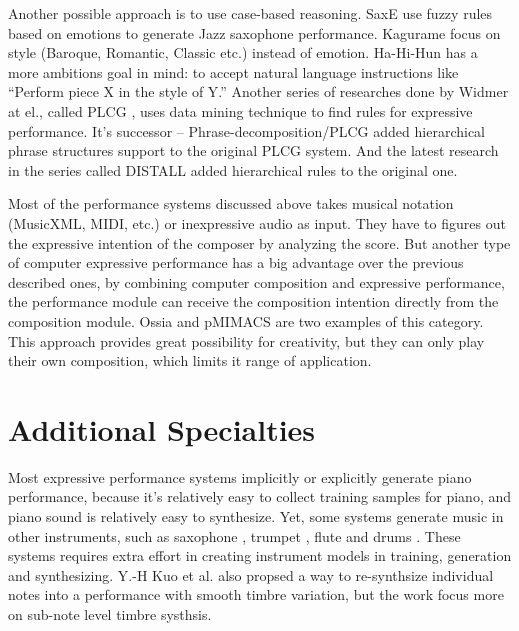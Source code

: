Another possible approach is to use case-based reasoning. SaxE \cite{40,41,42} use fuzzy rules based on emotions to generate Jazz saxophone performance. Kagurame \cite{43,44} focus on style (Baroque, Romantic, Classic etc.) instead of emotion. Ha-Hi-Hun \cite{45} has a more ambitions goal in mind: to accept natural language instructions like \enquote{Perform piece X in the style of Y.} Another series of researches done by Widmer at el., called PLCG \cite{46, 47, 48}, uses data mining technique to find rules for expressive performance. It's successor -- Phrase-decomposition/PLCG \cite{49} added hierarchical phrase structures support to the original PLCG system. And the latest research in the series called DISTALL \cite{50, 51} added hierarchical rules to the original one.

Most of the performance systems discussed above takes musical notation (MusicXML, MIDI, etc.) or inexpressive audio as input. They have to figures out the expressive intention of the composer by analyzing the score. But another type of computer expressive performance has a big advantage over the previous described ones, by combining computer composition and expressive performance, the performance module can receive the composition intention directly from the composition module. Ossia \cite{61} and pMIMACS \cite{pmimacs} are two examples of this category. This approach provides great possibility for creativity, but they can only play their own composition, which limits it range of application.

\section{Additional Specialties}

Most expressive performance systems implicitly or explicitly generate piano performance, because it's relatively easy to collect training samples for piano, and piano sound is relatively easy to synthesize. Yet, some systems generate music in other instruments, such as saxophone \cite{40, 41, 42}, trumpet \cite{24, 25}, flute \cite{39} and drums \cite{56}. These systems requires extra effort in creating instrument models in training, generation and synthesizing. Y.-H Kuo et al. \cite{profsu} also propsed a way to re-synthsize individual notes into a performance with smooth timbre variation, but the work focus more on sub-note level timbre systhsis.


